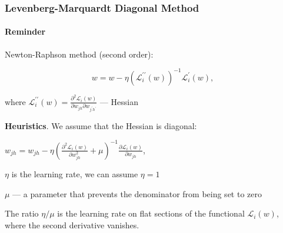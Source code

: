 \documentclass[fullscreen=true, bookmarks=true, hyperref={pdfencoding=unicode}]{beamer}
\begin{document}
\begin{frame}
  \frametitle{Levenberg-Marquardt Diagonal Method}
  \framesubtitle{Reminder}
  Newton-Raphson method (second order):

  $$ w = w - \eta(\mathcal{L}^{\prime\prime}_i(w))^{-1} \mathcal{L}^{\prime}_i(w),$$

  where $\mathcal{L}^{\prime\prime}_i(w) = 
  \frac{
  \partial^2 \mathcal{L}_i(w)}
  {\partial w_{jh} \partial w_{j^\prime h^\prime}}$ — Hessian

  {\bf Heuristics}. We assume that the Hessian is diagonal:

    $w_{jh} = w_{jh} - \eta \left(\frac{\partial^2 \mathcal{L}_i(w)}{\partial w^2_{jh}} + \mu \right)^{-1} \frac{\partial \mathcal{L}_i(w)}{\partial w_{jh}}$,

    $\eta$ is the learning rate, we can assume $\eta = 1$

    $\mu$ — a parameter that prevents the denominator from being set to zero

    The ratio $\eta/\mu$ is the learning rate on flat sections of the functional $\mathcal{L}_i(w)$, where the second derivative vanishes.
\end{frame}
\end{document}
